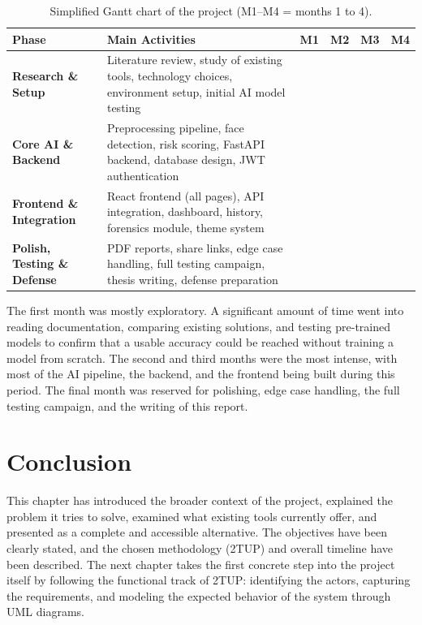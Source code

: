 \begin{table}[H]
\centering
\renewcommand{\arraystretch}{1.4}
\setlength{\tabcolsep}{8pt}
\begin{tabularx}{\textwidth}{|>{\bfseries}l|X|c|c|c|c|}
\hline
\rowcolor{deeplight}
\textbf{Phase} & \textbf{Main Activities} & \textbf{M1} & \textbf{M2} & \textbf{M3} & \textbf{M4} \\
\hline
Research \& Setup &
Literature review, study of existing tools, technology choices, environment setup, initial AI model testing
& \cellcolor{deepaccent} & & & \\
\hline
Core AI \& Backend &
Preprocessing pipeline, face detection, risk scoring, FastAPI backend, database design, JWT authentication
& \cellcolor{deepaccent} & \cellcolor{deepaccent} & & \\
\hline
Frontend \& Integration &
React frontend (all pages), API integration, dashboard, history, forensics module, theme system
& & \cellcolor{deepaccent} & \cellcolor{deepaccent} & \\
\hline
Polish, Testing \& Defense &
PDF reports, share links, edge case handling, full testing campaign, thesis writing, defense preparation
& & & \cellcolor{deepaccent} & \cellcolor{deepaccent} \\
\hline
\end{tabularx}
\caption{Simplified Gantt chart of the project (M1--M4 = months 1 to 4).}
\label{tab:gantt}
\end{table}

The first month was mostly exploratory. A significant amount of time went into reading documentation, comparing existing solutions, and testing pre-trained models to confirm that a usable accuracy could be reached without training a model from scratch. The second and third months were the most intense, with most of the AI pipeline, the backend, and the frontend being built during this period. The final month was reserved for polishing, edge case handling, the full testing campaign, and the writing of this report.

\section{Conclusion}

This chapter has introduced the broader context of the project, explained the problem it tries to solve, examined what existing tools currently offer, and presented \deepguard{} as a complete and accessible alternative. The objectives have been clearly stated, and the chosen methodology (2TUP) and overall timeline have been described. The next chapter takes the first concrete step into the project itself by following the functional track of 2TUP: identifying the actors, capturing the requirements, and modeling the expected behavior of the system through UML diagrams.
